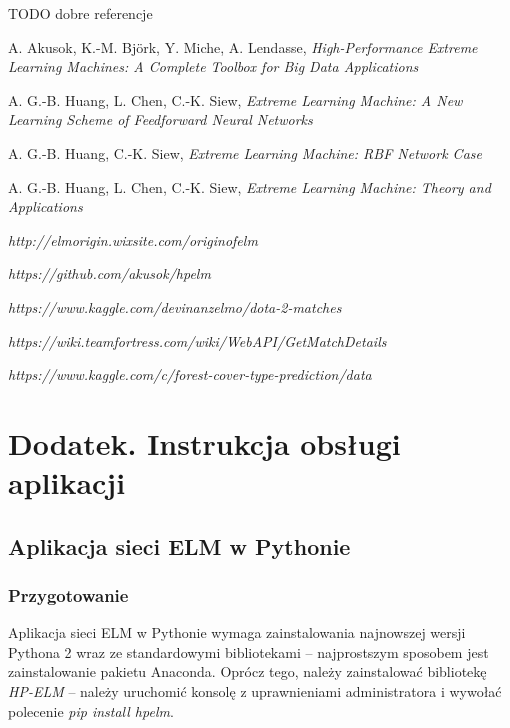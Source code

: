 \documentclass{article}
\begin{document}
TODO dobre referencje
\begin{thebibliography}{9}
  A. Akusok, K.-M. Björk, Y. Miche, A. Lendasse,
  \emph{High-Performance Extreme Learning Machines: A Complete Toolbox for Big Data Applications}


  A. G.-B. Huang, L. Chen, C.-K. Siew, 
  \emph{Extreme Learning Machine: A New Learning Scheme of Feedforward Neural Networks}
  
  A. G.-B. Huang, C.-K. Siew, 
  \emph{Extreme Learning Machine: RBF Network Case} 

  A. G.-B. Huang, L. Chen, C.-K. Siew, 
  \emph{Extreme Learning Machine: Theory and Applications} 
  
  \emph{http://elmorigin.wixsite.com/originofelm}  
  
  \emph{https://github.com/akusok/hpelm}  

  \emph{https://www.kaggle.com/devinanzelmo/dota-2-matches}
  
  \emph{https://wiki.teamfortress.com/wiki/WebAPI/GetMatchDetails}

  \emph{https://www.kaggle.com/c/forest-cover-type-prediction/data}
  
\end{thebibliography}

\clearpage
{}
\listoffigures
\clearpage
{}
\listoftables
\clearpage
\section*{Dodatek. Instrukcja obsługi aplikacji}
\subsection*{Aplikacja sieci ELM w Pythonie}
\subsubsection*{Przygotowanie}
Aplikacja sieci ELM w Pythonie wymaga zainstalowania najnowszej wersji Pythona 2 wraz ze standardowymi bibliotekami -- najprostszym sposobem jest zainstalowanie pakietu Anaconda. Oprócz tego, należy zainstalować bibliotekę \textit{HP-ELM} -- należy uruchomić konsolę z uprawnieniami administratora i wywołać polecenie \textit{pip install hpelm}. 
\end{document}
